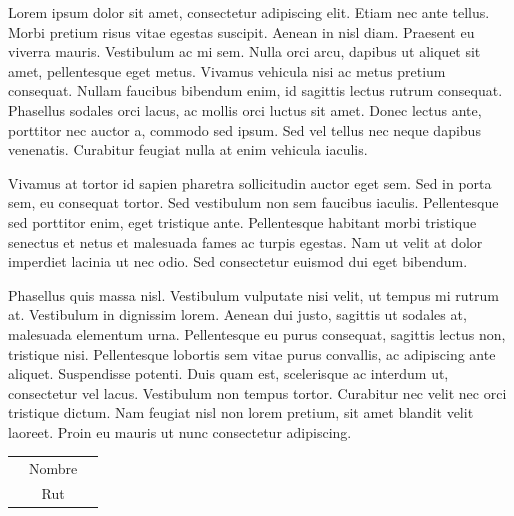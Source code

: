 \documentclass[letter,12pt]{texMemo} %
\begin{document}
\maketitle %


Lorem ipsum dolor sit amet, consectetur adipiscing elit. Etiam nec ante tellus. Morbi pretium risus vitae egestas suscipit. Aenean in nisl diam. Praesent eu viverra mauris. Vestibulum ac mi sem. Nulla orci arcu, dapibus ut aliquet sit amet, pellentesque eget metus. Vivamus vehicula nisi ac metus pretium consequat. Nullam faucibus bibendum enim, id sagittis lectus rutrum consequat. Phasellus sodales orci lacus, ac mollis orci luctus sit amet. Donec lectus ante, porttitor nec auctor a, commodo sed ipsum. Sed vel tellus nec neque dapibus venenatis. Curabitur feugiat nulla at enim vehicula iaculis.

Vivamus at tortor id sapien pharetra sollicitudin auctor eget sem. Sed in porta sem, eu consequat tortor. Sed vestibulum non sem faucibus iaculis. Pellentesque sed porttitor enim, eget tristique ante. Pellentesque habitant morbi tristique senectus et netus et malesuada fames ac turpis egestas. Nam ut velit at dolor imperdiet lacinia ut nec odio. Sed consectetur euismod dui eget bibendum.

Phasellus quis massa nisl. Vestibulum vulputate nisi velit, ut tempus mi rutrum at. Vestibulum in dignissim lorem. Aenean dui justo, sagittis ut sodales at, malesuada elementum urna. Pellentesque eu purus consequat, sagittis lectus non, tristique nisi. Pellentesque lobortis sem vitae purus convallis, ac adipiscing ante aliquet. Suspendisse potenti. Duis quam est, scelerisque ac interdum ut, consectetur vel lacus. Vestibulum non tempus tortor. Curabitur nec velit nec orci tristique dictum. Nam feugiat nisl non lorem pretium, sit amet blandit velit laoreet. Proin eu mauris ut nunc consectetur adipiscing.



\begin{center}\vspace{1cm}
\begin{tabular}{p{1cm}cp{1cm}}\hline
  &Nombre &\\
  &Rut&\\
\end{tabular}

\end{center}
\end{document}
